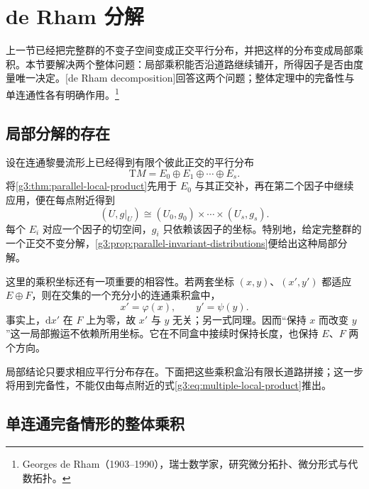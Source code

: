 
% 
% 

\section{de Rham 分解}
\label{g3:sec:0503}

上一节已经把完整群的不变子空间变成正交平行分布，并把这样的分布变成局部乘积。本节要解决两个整体问题：局部乘积能否沿道路继续铺开，所得因子是否由度量唯一决定。[de Rham decomposition]回答这两个问题；整体定理中的完备性与单连通性各有明确作用。\footnote{Georges de Rham（1903--1990），瑞士数学家，研究微分拓扑、微分形式与代数拓扑。}

\subsection{局部分解的存在}
\label{g3:subsec:0503:01}

设在连通黎曼流形上已经得到有限个彼此正交的平行分布
\[
	\mathrm{T}M=E_0\oplus E_1\oplus\cdots\oplus E_s.
\]
将\cref{g3:thm:parallel-local-product}先用于 \(E_0\) 与其正交补，再在第二个因子中继续应用，便在每点附近得到
\begin{equation}\label{g3:eq:multiple-local-product}
	(U,g|_U)\cong
	(U_0,g_0)\times\cdots\times(U_s,g_s).
\end{equation}
每个 \(E_i\) 对应一个因子的切空间，\(g_i\) 只依赖该因子的坐标。特别地，给定完整群的一个正交不变分解，\cref{g3:prop:parallel-invariant-distributions}便给出这种局部分解。

这里的乘积坐标还有一项重要的相容性。若两套坐标 \((x,y)\)、\((x',y')\) 都适应 \(E\oplus F\)，则在交集的一个充分小的连通乘积盒中，
\[
	x'=\varphi(x),\qquad y'=\psi(y).
\]
事实上，\(\mathrm dx'\) 在 \(F\) 上为零，故 \(x'\) 与 \(y\) 无关；另一式同理。因而“保持 \(x\) 而改变 \(y\)”这一局部搬运不依赖所用坐标。它在不同盒中接续时保持长度，也保持 \(E\)、\(F\) 两个方向。

局部结论只要求相应平行分布存在。下面把这些乘积盒沿有限长道路拼接；这一步将用到完备性，不能仅由每点附近的式\eqref{g3:eq:multiple-local-product}推出。

\subsection{单连通完备情形的整体乘积}
\label{g3:subsec:0503:02}

